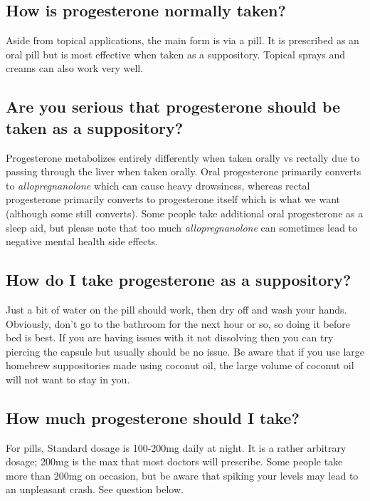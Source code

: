 \documentclass{article}
\begin{document}
\subsection{How is progesterone normally taken?}

Aside from topical applications, the main form is via a pill. It is prescribed as an oral pill but is most effective when taken as a suppository. Topical sprays and creams can also work very well.

\subsection{Are you serious that progesterone should be taken as a suppository?}

Progesterone metabolizes entirely differently when taken orally vs rectally due to passing through the liver when taken orally. Oral progesterone primarily converts to \textit{allopregnanolone} which can cause heavy drowsiness, whereas rectal progesterone primarily converts to progesterone itself which is what we want (although some still converts). Some people take additional oral progesterone as a sleep aid, but please note that too much \textit{allopregnanolone} can sometimes lead to negative mental health side effects.

\subsection{How do I take progesterone as a suppository?}

Just a bit of water on the pill should work, then dry off and wash your hands. Obviously, don’t go to the bathroom for the next hour or so, so doing it before bed is best. If you are having issues with it not dissolving then you can try piercing the capsule but usually should be no issue. Be aware that if you use large homebrew suppositories made using coconut oil, the large volume of coconut oil will not want to stay in you.

\subsection{How much progesterone should I take?}

For pills, Standard dosage is 100-200mg daily at night. It is a rather arbitrary dosage; 200mg is the max that most doctors will prescribe. Some people take more than 200mg on occasion, but be aware that spiking your levels may lead to an unpleasant crash. See question below.
\end{document}
